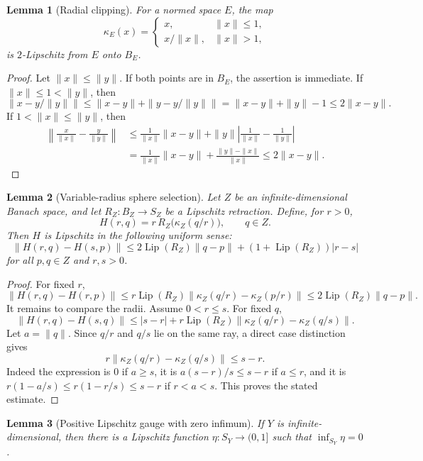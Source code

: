 \documentclass[11pt]{article}
\newtheorem{lemma}{Lemma}
\newcommand{\Lip}{\operatorname{Lip}}
\begin{document}
\begin{lemma}[Radial clipping]
For a normed space \(E\), the map
\[
\kappa_E(x)=
\begin{cases}
x, & \|x\|\le 1,\\
x/\|x\|, & \|x\|>1,
\end{cases}
\]
is \(2\)-Lipschitz from \(E\) onto \(B_E\).
\end{lemma}

\begin{proof}
Let \(\|x\|\le \|y\|\).  If both points are in \(B_E\), the assertion is
immediate.  If \(\|x\|\le1<\|y\|\), then
\[
\|x-y/\|y\|\|\le \|x-y\|+\|y-y/\|y\|\|
=\|x-y\|+\|y\|-1
\le 2\|x-y\|.
\]
If \(1<\|x\|\le\|y\|\), then
\[
\begin{aligned}
\left\|{\frac{x}{\|x\|}}-{\frac{y}{\|y\|}}\right\|
&\le \frac{1}{\|x\|}\|x-y\|
  +\|y\|\left|\frac{1}{\|x\|}-\frac{1}{\|y\|}\right|\\
&= \frac{1}{\|x\|}\|x-y\|
  +\frac{\|y\|-\|x\|}{\|x\|}
\le 2\|x-y\|.
\end{aligned}
\]
\end{proof}

\begin{lemma}[Variable-radius sphere selection]
Let \(Z\) be an infinite-dimensional Banach space, and let
\(R_Z:B_Z\to S_Z\) be a Lipschitz retraction.  Define, for \(r>0\),
\[
H(r,q)=r\,R_Z\bigl(\kappa_Z(q/r)\bigr),\qquad q\in Z.
\]
Then \(H\) is Lipschitz in the following uniform sense:
\[
\|H(r,q)-H(s,p)\|
\le 2\Lip(R_Z)\|q-p\|+(1+\Lip(R_Z))|r-s|
\]
for all \(p,q\in Z\) and \(r,s>0\).
\end{lemma}

\begin{proof}
For fixed \(r\),
\[
\|H(r,q)-H(r,p)\|
\le r\Lip(R_Z)\|\kappa_Z(q/r)-\kappa_Z(p/r)\|
\le 2\Lip(R_Z)\|q-p\|.
\]
It remains to compare the radii.  Assume \(0<r\le s\).  For fixed \(q\),
\[
\|H(r,q)-H(s,q)\|
\le |s-r|+r\Lip(R_Z)\|\kappa_Z(q/r)-\kappa_Z(q/s)\|.
\]
Let \(a=\|q\|\).  Since \(q/r\) and \(q/s\) lie on the same ray, a direct
case distinction gives
\[
r\|\kappa_Z(q/r)-\kappa_Z(q/s)\|\le s-r.
\]
Indeed the expression is \(0\) if \(a\ge s\), it is
\(a(s-r)/s\le s-r\) if \(a\le r\), and it is
\(r(1-a/s)\le r(1-r/s)\le s-r\) if \(r<a<s\).  This proves the stated
estimate.
\end{proof}

\begin{lemma}[Positive Lipschitz gauge with zero infimum]
If \(Y\) is infinite-dimensional, then there is a Lipschitz function
\(\eta:S_Y\to(0,1]\) such that \(\inf_{S_Y}\eta=0\).
\end{lemma}
\end{document}
